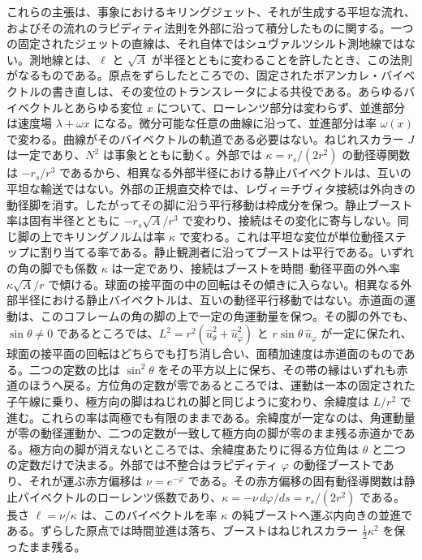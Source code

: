 \documentclass[a4paper]{article}
\begin{document}
これらの主張は、事象におけるキリングジェット、それが生成する平坦な流れ、およびその流れのラピディティ法則を外部に沿って積分したものに関する。一つの固定されたジェットの直線は、それ自体ではシュヴァルツシルト測地線ではない。測地線とは、\(\ell\) と \(\sqrt{A}\) が半径とともに変わることを許したとき、この法則がなるものである。原点をずらしたところでの、固定されたポアンカレ・バイベクトルの書き直しは、その変位のトランスレータによる共役である。あらゆるバイベクトルとあらゆる変位 \(x\) について、ローレンツ部分は変わらず、並進部分は速度場 \(\lambda+\omega x\) になる。微分可能な任意の曲線に沿って、並進部分は率 \(\omega(\dot{x})\) で変わる。曲線がそのバイベクトルの軌道である必要はない。ねじれスカラー \(J\) は一定であり、\(N^{2}\) は事象とともに動く。外部では \(\kappa=r_{s}/(2r^{2})\) の動径導関数は \(-r_{s}/r^{3}\) であるから、相異なる外部半径における静止バイベクトルは、互いの平坦な輸送ではない。外部の正規直交枠では、レヴィ＝チヴィタ接続は外向きの動径脚を消す。したがってその脚に沿う平行移動は枠成分を保つ。静止ブースト率は固有半径とともに \(-r_{s}\sqrt{A}/r^{3}\) で変わり、接続はその変化に寄与しない。同じ脚の上でキリングノルムは率 \(\kappa\) で変わる。これは平坦な変位が単位動径ステップに割り当てる率である。静止観測者に沿ってブーストは平行である。いずれの角の脚でも係数 \(\kappa\) は一定であり、接続はブーストを時間--動径平面の外へ率 \(\kappa\sqrt{A}/r\) で傾ける。球面の接平面の中の回転はその傾きに入らない。相異なる外部半径における静止バイベクトルは、互いの動径平行移動ではない。赤道面の運動は、このコフレームの角の脚の上で一定の角運動量を保つ。その脚の外でも、\(\sin\theta\neq 0\) であるところでは、\(L^{2}=r^{2}(\hat{u}_{\theta}^{2}+\hat{u}_{\varphi}^{2})\) と \(r\sin\theta\,\hat{u}_{\varphi}\) が一定に保たれ、球面の接平面の回転はどちらでも打ち消し合い、面積加速度は赤道面のものである。二つの定数の比は \(\sin^{2}\theta\) をその平方以上に保ち、その帯の縁はいずれも赤道のほうへ戻る。方位角の定数が零であるところでは、運動は一本の固定された子午線に乗り、極方向の脚はねじれの脚と同じように変わり、余緯度は \(L/r^{2}\) で進む。これらの率は両極でも有限のままである。余緯度が一定なのは、角運動量が零の動径運動か、二つの定数が一致して極方向の脚が零のまま残る赤道かである。極方向の脚が消えないところでは、余緯度あたりに得る方位角は \(\theta\) と二つの定数だけで決まる。外部では不整合はラピディティ \(\varphi\) の動径ブーストであり、それが運ぶ赤方偏移は \(\nu=e^{-\varphi}\) である。その赤方偏移の固有動径導関数は静止バイベクトルのローレンツ係数であり、\(\kappa=-\nu\,d\varphi/ds=r_{s}/(2r^{2})\) である。長さ \(\ell=\nu/\kappa\) は、このバイベクトルを率 \(\kappa\) の純ブーストへ運ぶ内向きの並進である。ずらした原点では時間並進は落ち、ブーストはねじれスカラー \(\tfrac12\kappa^{2}\) を保ったまま残る。
\end{document}
